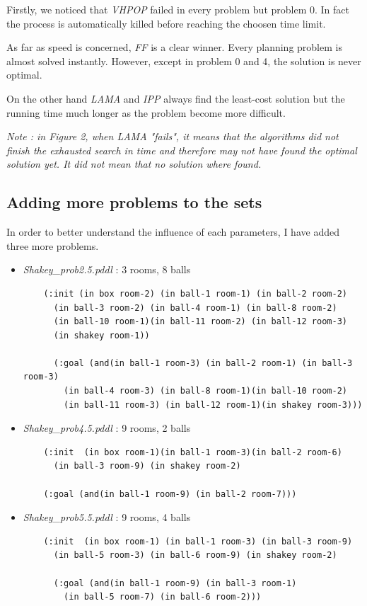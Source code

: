 Firstly, we noticed that \textit{VHPOP} failed in every problem but problem 0.
In fact
the process is automatically killed before reaching the choosen time limit.

As far as speed is concerned, \textit{FF} is a clear winner. Every planning
problem is almost solved instantly. However, except in problem 0 and 4, the
solution is never optimal.

On the other hand \textit{LAMA} and \textit{IPP} always find the least-cost
solution but the running time much longer as the problem become more difficult.

\textit{Note : in Figure 2, when LAMA "fails", it means that the algorithms did
not finish the exhausted search in time and therefore may not have found the
optimal solution yet. It did not mean that no solution where found.}

\subsection*{Adding more problems to the sets}

In order to better understand the influence of each parameters, I have added
three more problems.

\begin{itemize}
  \item \textit{Shakey\_prob2.5.pddl} : 3 rooms, 8 balls
  \vspace*{1em}
  \begin{verbatim}
    (:init (in box room-2) (in ball-1 room-1) (in ball-2 room-2)
      (in ball-3 room-2) (in ball-4 room-1) (in ball-8 room-2)
      (in ball-10 room-1)(in ball-11 room-2) (in ball-12 room-3)
      (in shakey room-1))

      (:goal (and(in ball-1 room-3) (in ball-2 room-1) (in ball-3 room-3)
        (in ball-4 room-3) (in ball-8 room-1)(in ball-10 room-2)
        (in ball-11 room-3) (in ball-12 room-1)(in shakey room-3)))

  \end{verbatim}
  \item \textit{Shakey\_prob4.5.pddl} : 9 rooms, 2 balls
  \vspace*{1em}
  \begin{verbatim}
    (:init  (in box room-1)(in ball-1 room-3)(in ball-2 room-6)
      (in ball-3 room-9) (in shakey room-2)

    (:goal (and(in ball-1 room-9) (in ball-2 room-7)))
  \end{verbatim}
  \thispagestyle{empty}
  \item \textit{Shakey\_prob5.5.pddl} : 9 rooms, 4 balls
  \vspace*{1em}
  \begin{verbatim}
    (:init  (in box room-1) (in ball-1 room-3) (in ball-3 room-9)
      (in ball-5 room-3) (in ball-6 room-9) (in shakey room-2)

      (:goal (and(in ball-1 room-9) (in ball-3 room-1)
        (in ball-5 room-7) (in ball-6 room-2)))
    \end{verbatim}
\end{itemize}

